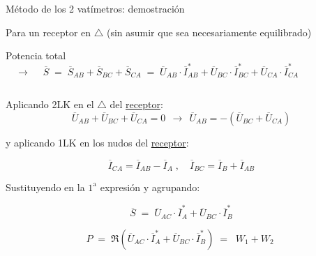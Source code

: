 \documentclass[aspectratio=169, usenames,svgnames,dvipsnames]{beamer}
\begin{document}
\begin{frame}{Método de los 2 vatímetros: \hspace{3mm}demostración}

    \vspace{2mm}
    Para un \alert{receptor} en $\triangle$    
    \hspace{3mm}(sin asumir que sea necesariamente equilibrado)

    \vspace{0.5mm}
    \alert{Potencia total} 
    \(  \quad \rightarrow \quad\;
        \overline{S}
        \; = \; 
        \overline{S}_{AB} + \overline{S}_{BC} + \overline{S}_{CA}
        \; = \; 
        \overline{U}_{AB} \cdot \overline{I}_{AB}^* + \overline{U}_{BC} \cdot \overline{I}_{BC}^* + \overline{U}_{CA} \cdot \overline{I}_{CA}^*
    \)

    \vspace{2mm}
	\begin{columns}
	\begin{column}{0.6\linewidth}
    
        Aplicando \alert{2LK} en el $\triangle$ del \hyperlink{diapo:triangulo_desequilibrado}{receptor}:
        \begin{equation*}
    	    \overline{U}_{AB} + \overline{U}_{BC} + \overline{U}_{CA} = 0 
            \;\, \rightarrow \;\, 
            \overline{U}_{AB} = -(\overline{U}_{BC} + \overline{U}_{CA})
    	\end{equation*}

        y aplicando \alert{1LK} en los nudos del \hyperlink{diapo:triangulo_desequilibrado}{receptor}:

        \vspace{-2mm}
    	\begin{equation*}
    	    \overline{I}_{CA} = \overline{I}_{AB} - \overline{I}_A \; , 
            \quad 
            \overline{I}_{BC} = \overline{I}_B + \overline{I}_{AB}
    	\end{equation*}

    	Sustituyendo en la $1^{\textrm{a}}$ expresión y agrupando:

        \vspace{-2mm}
        \begin{equation*}
            \overline{S}
            \; = \;
            \overline{U}_{AC} \cdot \overline{I}_A^* + \overline{U}_{BC} \cdot \overline{I}_B^*
        \end{equation*} 

        \vspace{-3mm}
        \begin{equation*}
            P 
            \; = \;
            \Re(\overline{U}_{AC} \cdot \overline{I}_A^* + \overline{U}_{BC} \cdot \overline{I}_B^* )
            \; = \;
            \boxed{\; W_1 + W_2 \;}
        \end{equation*}  


\end{column}
\end{columns}
\end{frame}
\end{document}
